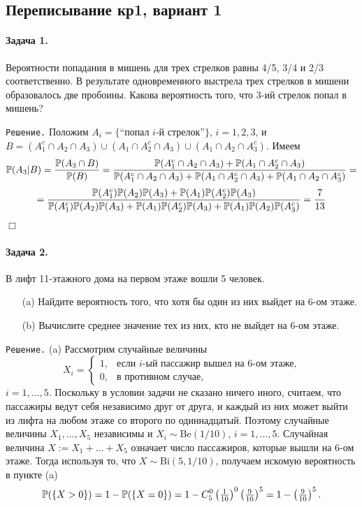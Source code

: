 \documentclass[12pt, a4paper]{article}\usepackage[]{graphicx}\usepackage[]{color}
\begin{document}
\subsection{Переписывание кр1, вариант 1}

\paragraph{Задача 1.} %
Вероятности попадания в мишень для трех стрелков равны 4/5, 3/4 и 2/3 соответственно. В результате одновременного выстрела трех стрелков в мишени образовалось две пробоины. Какова вероятность того, что 3-ий стрелок попал в мишень?

\verb"Решение." Положим $A_i = \{\text{``попал $i$-й стрелок''}\}$, $i = 1,2,3$, и $B = (A_1^c \cap A_2 \cap A_3) \cup (A_1 \cap A_2^c \cap A_3) \cup (A_1 \cap A_2 \cap A_3^c)$. Имеем
\[
\P(A_3|B) = \frac{\P(A_3 \cap B)}{\P(B)} = \frac{\P(A_1^c \cap A_2 \cap A_3) + \P(A_1 \cap A_2^c \cap A_3)}{\P(A_1^c \cap A_2 \cap A_3) + \P(A_1 \cap A_2^c \cap A_3) + \P(A_1 \cap A_2 \cap A_3^c)} =
\]
\[
= \frac{\P(A_1^c)\P(A_2)\P(A_3) + \P(A_1)\P(A_2^c)\P(A_3)}{\P(A_1^c)\P(A_2)\P(A_3) + \P(A_1)\P(A_2^c)\P(A_3) + \P(A_1)\P(A_2)\P(A_3^c)} = \frac{7}{13}
\]
 $\Box$
\paragraph{Задача 2.}
В лифт 11-этажного дома на первом этаже вошли 5 человек.
\begin{itemize}
  \item[(a)] Найдите вероятность того, что хотя бы один из них выйдет на 6-ом этаже.
  \item[(b)] Вычислите среднее значение тех из них, кто не выйдет на 6-ом этаже.
\end{itemize}

\verb"Решение." (a) Рассмотрим случайные величины
\[
X_i =
                  \begin{cases}
                     1,     &   \text{если $i$-ый пассажир вышел на 6-ом этаже,} \\
                     0,     &   \text{в противном случае,}
                  \end{cases}
\]
$i = 1,\ldots,5$. Поскольку в условии задачи не сказано ничего иного, считаем, что пассажиры ведут себя независимо друг от друга, и каждый из них может выйти из лифта на любом этаже со второго по одиннадцатый. Поэтому случайные величины $X_1, \dots, X_5$ независимы и $X_i \sim \mathrm{Be}(1/10)$, $i = 1,\ldots,5$.
Случайная величина $X:=X_1+\ldots+X_5$ означает число пассажиров, которые вышли на 6-ом этаже. Тогда используя то, что $X \sim \mathrm{Bi}(5,1/10)$, получаем искомую вероятность в пункте (a)
\[
\P(\{X>0\}) = 1 - \P(\{X=0\}) = 1 - C_{5}^{0}\left(\tfrac{1}{10}\right)^{0}\left(\tfrac{9}{10}\right)^{5} = 1 - \left(\tfrac{9}{10}\right)^{5} \text{.}
\]
\end{document}
